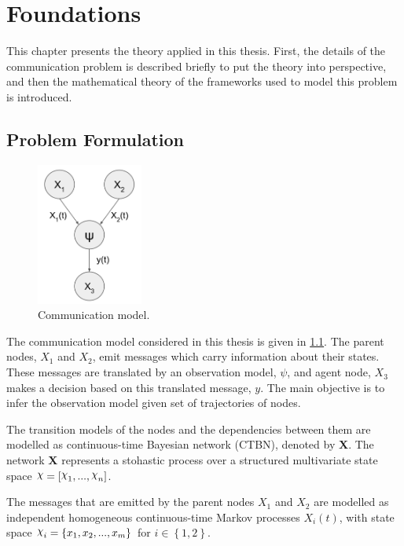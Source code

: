 \chapter{Foundations}
\label{chap:2}

This chapter presents the theory applied in this thesis. First, the details of the communication problem is described briefly to put the theory into perspective, and then the mathematical theory of the frameworks used to model this problem is introduced. 

\section{Problem Formulation}
\label{sec:prob_formulation}
\begin{figure}
	\begin{center}
		\includegraphics[width=3.5cm]{figures/simple_graph}
		\caption{Communication model.}
	\end{center}
	\label{fig:graph_model}
\end{figure} 
The communication model considered in this thesis is given in \cref{fig:graph_model}. The parent nodes, $X_{1}$ and $ X_{2}$, emit messages which carry information about their states. These messages are translated by an observation model, $\psi$, and agent node, $ X_{3} $ makes a decision based on this translated message, $ y $. The main objective is to infer the observation model given set of trajectories of nodes.

The transition models of the nodes and the dependencies between them are modelled as continuous-time Bayesian network (CTBN), denoted by \textbf{X}. The network \textbf{X} represents a stohastic process over a structured multivariate state space $ \rchi = [\rchi_1,..., \rchi_n] $. 

The messages that are emitted by the parent nodes $X_{1}$ and $ X_{2} $ are modelled as independent homogeneous continuous-time Markov processes $X_{i}(t)$, with state space $ \rchi_{i} = \left\lbrace x_{1}, x_{2}, ..., x_{m} \right\rbrace  $ for $ i \in \left\lbrace 1,2 \right\rbrace $.


